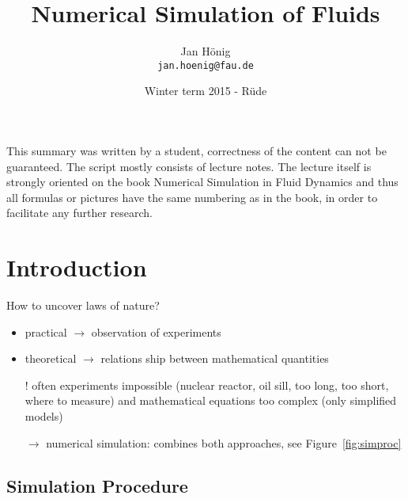\documentclass[a4paper,11pt]{scrartcl}
\title{Numerical Simulation of Fluids}
\author{Jan H\"onig \\ \texttt{jan.hoenig@fau.de}}
\date{Winter term 2015 - R\"ude}
\begin{document}
\maketitle

\vfill

This summary was written by a student, correctness of the content can not be guaranteed. The script mostly consists of lecture notes. The lecture itself is strongly oriented on the book Numerical Simulation in Fluid Dynamics and thus all formulas or pictures have the same numbering as in the book, in order to facilitate any further research.


\newpage
\tableofcontents
\newpage

\section{Introduction}
How to uncover laws of nature?
\begin{itemize}
	\item practical $\rightarrow$ observation of experiments
	\item theoretical $\rightarrow$ relations ship between mathematical quantities
	\item[!] often experiments impossible (nuclear reactor, oil sill, too long, too short, where to measure) and mathematical equations too complex (only simplified models)
	\item[$\rightarrow$] numerical simulation: combines both approaches, see Figure~\ref{fig:simproc}
\end{itemize}

\subsection{Simulation Procedure}
\end{document}
